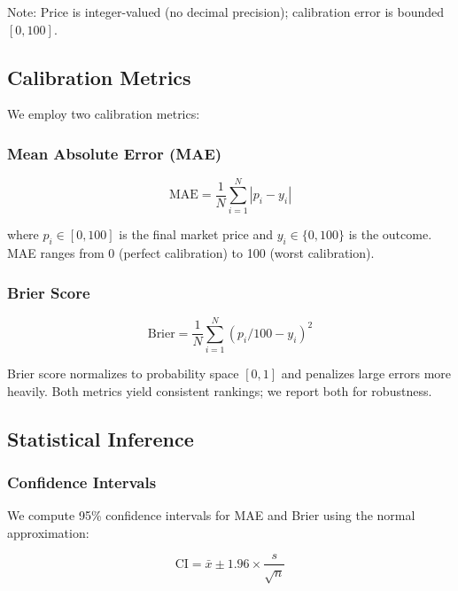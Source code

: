 \documentclass[a4paper,11pt]{article}
\theoremstyle{plain}
\theoremstyle{definition}
\theoremstyle{remark}
\begin{document}
Note: Price is integer-valued (no decimal precision); calibration error is bounded $[0, 100]$.

\subsection{Calibration Metrics}
\label{subsec:metrics}

We employ two calibration metrics:

\subsubsection{Mean Absolute Error (MAE)}

\begin{equation}
\text{MAE} = \frac{1}{N} \sum_{i=1}^{N} |p_i - y_i|
\label{eq:mae}
\end{equation}

where $p_i \in [0, 100]$ is the final market price and $y_i \in \{0, 100\}$ is the outcome. MAE ranges from 0 (perfect calibration) to 100 (worst calibration).

\subsubsection{Brier Score}

\begin{equation}
\text{Brier} = \frac{1}{N} \sum_{i=1}^{N} (p_i/100 - y_i)^2
\label{eq:brier}
\end{equation}

Brier score normalizes to probability space $[0, 1]$ and penalizes large errors more heavily. Both metrics yield consistent rankings; we report both for robustness.

\subsection{Statistical Inference}
\label{subsec:inference}

\subsubsection{Confidence Intervals}

We compute 95\% confidence intervals for MAE and Brier using the normal approximation:

\begin{equation}
\text{CI} = \bar{x} \pm 1.96 \times \frac{s}{\sqrt{n}}
\label{eq:ci}
\end{equation}
\end{document}

